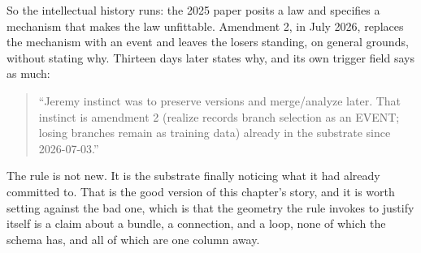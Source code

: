 So the intellectual history runs: the 2025 paper posits a law and specifies a mechanism that makes the law unfittable. Amendment 2, in July 2026, replaces the mechanism with an event and leaves the losers standing, on general grounds, without stating why. Thirteen days later  states why, and its own trigger field says as much:

\begin{quote}
``Jeremy instinct was to preserve versions and merge/analyze later. That instinct is amendment 2 (realize records branch selection as an EVENT; losing branches remain as training data) already in the substrate since 2026-07-03.''
\end{quote}

The rule is not new. It is the substrate finally noticing what it had already committed to. That is the good version of this chapter's story, and it is worth setting against the bad one, which is that the geometry the rule invokes to justify itself is a claim about a bundle, a connection, and a loop, none of which the schema has, and all of which are one column away.
